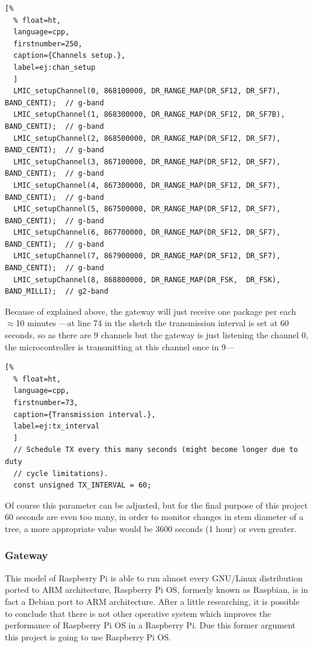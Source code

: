 \documentclass[11pt,a4paper,dvipsnames,twoside]{article}
\newcounter{subsubsubsection}[subsubsection]
\begin{document}
\begin{lstlisting}[%
  % float=ht,
  language=cpp,
  firstnumber=250,
  caption={Channels setup.},
  label=ej:chan_setup
  ]
  LMIC_setupChannel(0, 868100000, DR_RANGE_MAP(DR_SF12, DR_SF7),  BAND_CENTI);  // g-band
  LMIC_setupChannel(1, 868300000, DR_RANGE_MAP(DR_SF12, DR_SF7B), BAND_CENTI);  // g-band
  LMIC_setupChannel(2, 868500000, DR_RANGE_MAP(DR_SF12, DR_SF7),  BAND_CENTI);  // g-band
  LMIC_setupChannel(3, 867100000, DR_RANGE_MAP(DR_SF12, DR_SF7),  BAND_CENTI);  // g-band
  LMIC_setupChannel(4, 867300000, DR_RANGE_MAP(DR_SF12, DR_SF7),  BAND_CENTI);  // g-band
  LMIC_setupChannel(5, 867500000, DR_RANGE_MAP(DR_SF12, DR_SF7),  BAND_CENTI);  // g-band
  LMIC_setupChannel(6, 867700000, DR_RANGE_MAP(DR_SF12, DR_SF7),  BAND_CENTI);  // g-band
  LMIC_setupChannel(7, 867900000, DR_RANGE_MAP(DR_SF12, DR_SF7),  BAND_CENTI);  // g-band
  LMIC_setupChannel(8, 868800000, DR_RANGE_MAP(DR_FSK,  DR_FSK),  BAND_MILLI);  // g2-band
\end{lstlisting}

Because of explained above, the gateway will just receive one package per each $\approx$10 minutes ---at line 74 in the sketch the transmission interval is set at 60 seconds, so as there are 9 channels but the gateway is just listening the channel 0, the microcontroller is transmitting at this channel once in 9---

\begin{lstlisting}[%
  % float=ht,
  language=cpp,
  firstnumber=73,
  caption={Transmission interval.},
  label=ej:tx_interval
  ]
  // Schedule TX every this many seconds (might become longer due to duty
  // cycle limitations).
  const unsigned TX_INTERVAL = 60;
\end{lstlisting}

Of course this parameter can be adjusted, but for the final purpose of this project 60 seconds are even too many, in order to monitor changes in stem diameter of a tree, a more appropriate value would be 3600 seconds (1 hour) or even greater.  

\subsubsection{Gateway}

This model of Raspberry Pi is able to run almost every GNU/Linux distribution ported to ARM architecture, Raspberry Pi OS, formerly known as Raspbian, \cite{RaspberryPiOs} is in fact a Debian port to ARM architecture. After a little researching, it is possible to conclude that there is not other operative system which improves the performance of Raspberry Pi OS in a Raspberry Pi. Due this former argument this project is going to use Raspberry Pi OS.
\end{document}
